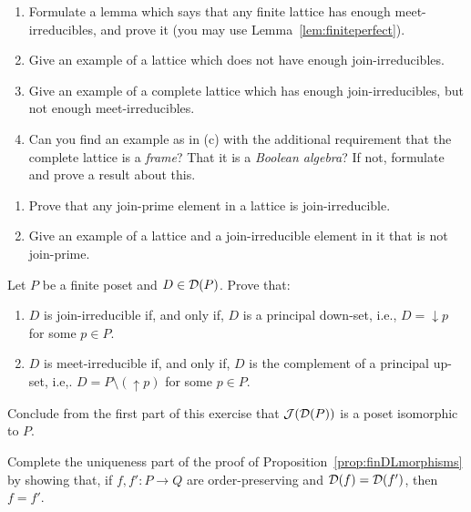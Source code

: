 \begin{exercise}\label{exe:perfect}
\begin{enumerate}
\item Formulate a lemma which says that any finite lattice has enough meet-irreducibles, and prove it (you may use Lemma~\ref{lem:finiteperfect}).
\item Give an example of a lattice which does not have enough join-irreducibles.
\item Give an example of a complete lattice which has enough join-irreducibles, but not enough meet-irreducibles.
\item Can you find an example as in (c) with the additional requirement that the complete lattice is a \emph{frame}? That it is a \emph{Boolean algebra}? If not, formulate and prove a result about this.
\end{enumerate}
\end{exercise}

\begin{exercise}\label{exe:joinirrjoinp}
\begin{enumerate}
\item Prove that any join-prime element in a lattice is join-irreducible.
\item Give an example of a lattice and a join-irreducible element in it that is not join-prime.
\end{enumerate}
\end{exercise}


\begin{exercise}\label{exe:irrindownset}
Let $P$ be a finite poset and $D \in \mathcal{D}(P)$. Prove that:
\begin{enumerate}
\item $D$ is join-irreducible if, and only if, $D$ is a principal down-set, i.e., $D = {\downarrow} p$ for some $p \in P$.
\item $D$ is meet-irreducible if, and only if, $D$ is the complement of a principal up-set, i.e,. $D = P \setminus ({\uparrow} p)$ for some $p \in P$.
\end{enumerate}
Conclude from the first part of this exercise that $\mathcal{J}(\mathcal{D}(P))$ is a poset isomorphic to $P$.
\end{exercise}

\begin{exercise}\label{exe:completeuniquenesspart}
Complete the uniqueness part of the proof of Proposition~\ref{prop:finDLmorphisms} by showing that, if $f, f' \colon P \to Q$ are order-preserving and $\mathcal{D}(f) = \mathcal{D}(f')$, then $f = f'$.%
\end{exercise}

